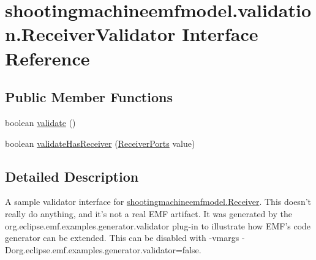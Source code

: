 \hypertarget{interfaceshootingmachineemfmodel_1_1validation_1_1_receiver_validator}{\section{shootingmachineemfmodel.\-validation.\-Receiver\-Validator Interface Reference}
\label{interfaceshootingmachineemfmodel_1_1validation_1_1_receiver_validator}
}
\subsection*{Public Member Functions}
\begin{DoxyCompactItemize}
\item 
boolean \hyperlink{interfaceshootingmachineemfmodel_1_1validation_1_1_receiver_validator_a6d58086356387bf7a876ee77b57c7318}{validate} ()
\item 
boolean \hyperlink{interfaceshootingmachineemfmodel_1_1validation_1_1_receiver_validator_a98f08c31a54ef8c9ecf530a64be74347}{validate\-Has\-Receiver} (\hyperlink{interfaceshootingmachineemfmodel_1_1_receiver_ports}{Receiver\-Ports} value)
\end{DoxyCompactItemize}


\subsection{Detailed Description}
A sample validator interface for \hyperlink{interfaceshootingmachineemfmodel_1_1_receiver}{shootingmachineemfmodel.\-Receiver}. This doesn't really do anything, and it's not a real E\-M\-F artifact. It was generated by the org.\-eclipse.\-emf.\-examples.\-generator.\-validator plug-\/in to illustrate how E\-M\-F's code generator can be extended. This can be disabled with -\/vmargs -\/\-Dorg.\-eclipse.\-emf.\-examples.\-generator.\-validator=false. 

